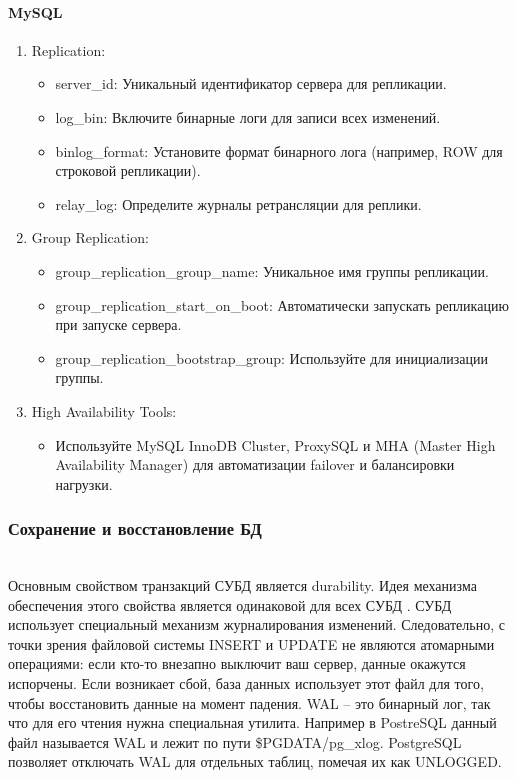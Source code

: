 \paragraph{MySQL} \cite{availability-mysql}
\begin{enumerate}
    \item Replication:
    \begin{itemize}
        \item server\_id: Уникальный идентификатор сервера для репликации.
        \item log\_bin: Включите бинарные логи для записи всех изменений.
        \item binlog\_format: Установите формат бинарного лога (например, ROW для строковой репликации).
        \item relay\_log: Определите журналы ретрансляции для реплики.
    \end{itemize}
    \item Group Replication:
    \begin{itemize}
        \item group\_replication\_group\_name: Уникальное имя группы репликации.
        \item group\_replication\_start\_on\_boot: Автоматически запускать репликацию при запуске сервера.
        \item group\_replication\_bootstrap\_group: Используйте для инициализации группы.
    \end{itemize}
    \item High Availability Tools:
    \begin{itemize}
        \item Используйте MySQL InnoDB Cluster, ProxySQL и MHA (Master High Availability Manager) для автоматизации failover и балансировки нагрузки.
    \end{itemize}
\end{enumerate}


\subsubsection{Сохранение и восстановление БД} ~\\

Основным свойством транзакций СУБД является durability. Идея механизма обеспечения этого свойства является одинаковой для всех СУБД \autocite{PostrgreSQL1}. СУБД использует специальный механизм журналирования изменений.
Следовательно, с точки зрения файловой системы INSERT и UPDATE не являются атомарными операциями: если кто-то внезапно выключит ваш сервер, данные окажутся испорчены. Если возникает сбой, база данных использует этот файл для того, чтобы восстановить данные на момент падения. WAL -- это бинарный лог, так что для его чтения нужна специальная утилита.
Например в PostreSQL данный файл называется WAL и лежит по пути \$PGDATA/pg\_xlog.
PostgreSQL позволяет отключать WAL для отдельных таблиц, помечая их как UNLOGGED.

